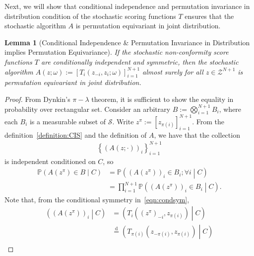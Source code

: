 \documentclass{article}
\newcommand{\cprob}[2]{\mathbb{P}\left( #1 \middle\vert #2 \right)}
\newcommand{\oo}[1]{\left( #1 \right)}
\newcommand{\cc}[1]{\left[ #1 \right]}
\newtheorem{lemma}{Lemma}
\begin{document}
        Next, we will show that conditional independence and permutation invariance in distribution condition of the stochastic scoring functions $T$ ensures that the stochastic algorithm $A$ is permutation equivariant in joint distribution.
        \begin{lemma}
        [Conditional Independence \& Permutation Invariance in Distribution implies Permutation Equivariance]
        \label{lemma:CISthenequivaraint}
            If the stochastic non-conformity score functions $T$ are conditionally independent and symmetric, then the stochastic algorithm
            $A\left(z; \omega\right):=\left[T_i\left(z_{-i},z_i;\omega\right)\right]_{i=1}^{N+1}$ almost surely for all $z \in \mathcal{Z}^{N+1}$ is permutation equivariant in joint distribution.
        \end{lemma}
        \begin{proof}
            From Dynkin's $\pi-\lambda$ theorem, it is sufficient to show the equality in probability over rectangular set. Consider an arbitrary $B := \bigotimes_{i=1}^{N+1} B_i$, where each $B_i$ is a measurable subset of $\mathcal{S}$. Write $z^\pi:=\cc{z_{\pi(i)}}_{i=1}^{N+1}$. From the definition~\ref{definition:CIS} and the definition of $A$, we have that the collection
            \begin{align*}
                \left\{
                    \oo{A\oo{z;\cdot}}_i
                \right\}_{i=1}^{N+1}
            \end{align*}
            is independent conditioned on $C$, so
            \begin{align*}
                \cprob{A\left(z^\pi\right) \in B}{C}
                &=
                \cprob{\oo{A\left(z^\pi\right)}_i \in B_i;
                \forall i}{C}\\
                &=
                \prod_{i=1}^{N+1}
                \cprob{\oo{A\left(z^\pi\right)}_i \in B_i}{C}.
            \end{align*}
            Note that, from the conditional symmetry in~\ref{eqn:condsym},
            \begin{align*}
                \left(\oo{A\left(z^\pi\right)}_i\middle\vert C\right)
                &=
                \left(
                T_i\oo{\oo{z^\pi}_{-i},z_{\pi(i)}}
                \middle\vert C\right)\\
                &\overset{\text{d}}{=}
                \left(
                T_{\pi(i)}\oo{z_{-\pi(i)},z_{\pi(i)}}
                \middle\vert C\right)\\

\end{align*}
\end{proof}
\end{document}
